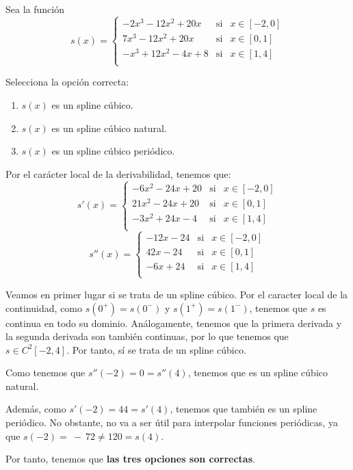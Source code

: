 \begin{ejercicio}
    Sea la función
    \begin{equation*}
        s(x)=\left\{\begin{array}{lll}
            -2x^3 - 12x^2 + 20x & \text{si} & x\in [-2, 0]\\
            7x^3 - 12x^2 + 20x & \text{si} & x\in [0, 1]\\
            -x^3 + 12x^2 - 4x + 8 & \text{si} & x\in [1, 4]\\
        \end{array} \right.
    \end{equation*}

    Selecciona la opción correcta:
    \begin{enumerate}
        \item $s(x)$ es un spline cúbico.
        \item $s(x)$ es un spline cúbico natural.
        \item $s(x)$ es un spline cúbico periódico.
    \end{enumerate}

    Por el carácter local de la derivabilidad, tenemos que:
    \begin{equation*}
        s'(x)=\left\{\begin{array}{lll}
            -6x^2 - 24x + 20 & \text{si} & x\in [-2, 0]\\
            21x^2 - 24x + 20 & \text{si} & x\in [0, 1]\\
            -3x^2 + 24x - 4& \text{si} & x\in [1, 4]\\
        \end{array} \right.
    \end{equation*}
    \begin{equation*}
        s''(x)=\left\{\begin{array}{lll}
            -12x - 24 & \text{si} & x\in [-2, 0]\\
            42x - 24 & \text{si} & x\in [0, 1]\\
            -6x + 24& \text{si} & x\in [1, 4]\\
        \end{array} \right.
    \end{equation*}

    Veamos en primer lugar si se trata de un spline cúbico. Por el caracter local de la continuidad, como $s(0^+)=s(0^-)$ y $s(1^+)=s(1^-)$, tenemos que $s$ es continua en todo su dominio. Análogamente, tenemos que la primera derivada y la segunda derivada son también continuas, por lo que tenemos que $s\in C^2[-2,4]$. Por tanto, sí se trata de un spline cúbico.

    Como tenemos que $s''(-2)=0=s''(4)$, tenemos que es un spline cúbico natural.

    Además, como $s'(-2)=44=s'(4)$, tenemos que también es un spline periódico. No obstante, no va a ser útil para interpolar funciones periódicas, ya que $s(-2)=~-~72\neq 120 = s(4)$.

    Por tanto, tenemos que \textbf{las tres opciones son correctas}.
\end{ejercicio}
